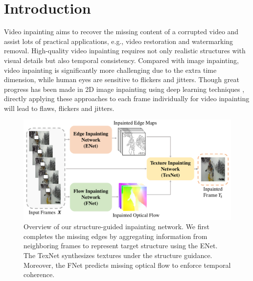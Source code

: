 

\section{Introduction}


Video inpainting aims to recover the missing content of a corrupted video and assist lots of practical applications, e.g., video restoration and watermarking removal. 
High-quality video inpainting requires not only realistic structures with visual details but also temporal consistency. 
Compared with image inpainting, video inpainting is significantly more challenging due to the extra time dimension, while human eyes are sensitive to flickers and jitters.
% 
Though great progress has been made in 2D image inpainting using deep learning techniques \cite{yu2018free,Xiong_2019_CVPR}, directly applying these approaches to each frame individually for video inpainting will lead to flaws, flickers and jitters. 

\begin{figure}[t]
	\centering
	\includegraphics[width=1.0\columnwidth]{zong} %
	\caption{Overview of our structure-guided inpainting network. We first completes the missing edges by aggregating information from neighboring frames to represent target structure using the ENet. The TexNet synthesizes textures under the structure guidance. Moreover, the FNet predicts missing optical flow to enforce temporal coherence.}
	\label{zong}
\end{figure}



